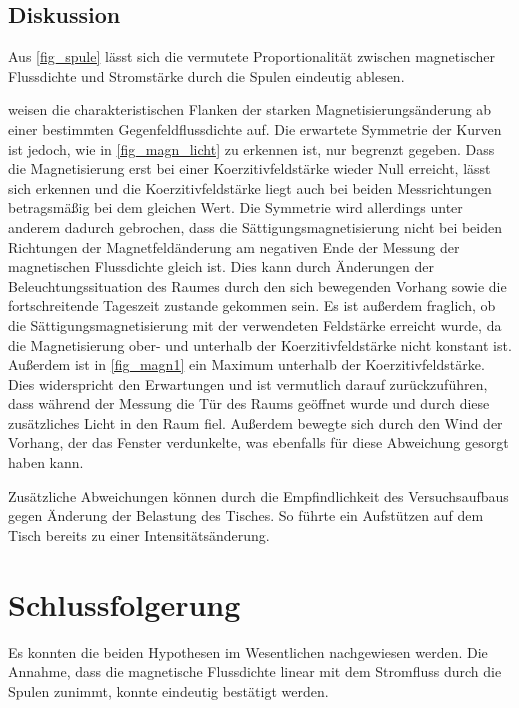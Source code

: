 \documentclass[
	a4paper,
	12pt,
	pagesize,
	ngerman
]{scrartcl}
\begin{document}
	\subsection{Diskussion}

	Aus \cref{fig_spule} lässt sich die vermutete Proportionalität zwischen magnetischer Flussdichte und Stromstärke durch die Spulen eindeutig ablesen.
	
	 weisen die charakteristischen Flanken der starken Magnetisierungsänderung ab einer bestimmten Gegenfeldflussdichte auf.
	Die erwartete Symmetrie der Kurven ist jedoch, wie in \cref{fig_magn_licht} zu erkennen ist, nur begrenzt gegeben.
	Dass die Magnetisierung erst bei einer Koerzitivfeldstärke wieder Null erreicht, lässt sich erkennen und die Koerzitivfeldstärke liegt auch bei beiden Messrichtungen betragsmäßig bei dem gleichen Wert.
	Die Symmetrie wird allerdings unter anderem dadurch gebrochen, dass die Sättigungsmagnetisierung nicht bei beiden Richtungen der Magnetfeldänderung am negativen Ende der Messung der magnetischen Flussdichte gleich ist.
	Dies kann durch Änderungen der Beleuchtungssituation des Raumes durch den sich bewegenden Vorhang sowie die fortschreitende Tageszeit zustande gekommen sein. %
	Es ist außerdem fraglich, ob die Sättigungsmagnetisierung mit der verwendeten Feldstärke erreicht wurde, da die Magnetisierung ober- und unterhalb der Koerzitivfeldstärke nicht konstant ist.
	Außerdem ist in \cref{fig_magn1} ein Maximum unterhalb der Koerzitivfeldstärke.
	Dies widerspricht den Erwartungen und ist vermutlich darauf zurückzuführen, dass während der Messung die Tür des Raums geöffnet wurde und durch diese zusätzliches Licht in den Raum fiel.
	Außerdem bewegte sich durch den Wind der Vorhang, der das Fenster verdunkelte, was ebenfalls für diese Abweichung gesorgt haben kann.%
	
	Zusätzliche Abweichungen können durch die Empfindlichkeit des Versuchsaufbaus gegen Änderung der Belastung des Tisches.
	So führte ein Aufstützen auf dem Tisch bereits zu einer Intensitätsänderung.
	
	\section{Schlussfolgerung}
	Es konnten die beiden Hypothesen im Wesentlichen nachgewiesen werden.
	Die Annahme, dass die magnetische Flussdichte linear mit dem Stromfluss durch die Spulen zunimmt, konnte eindeutig bestätigt werden.
	
\end{document}
